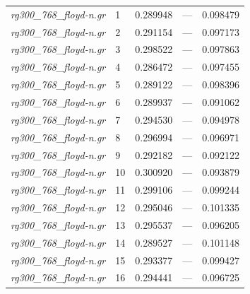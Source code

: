 \documentclass[12pt]{article}
\begin{document}
\begin{longtable}{l|l|lll}
\textit{rg300\_768\_floyd-n.gr}  &  1        & 0.289948               & ---                  & 0.098479                   \\
\textit{rg300\_768\_floyd-n.gr}  &  2        & 0.291154               & ---                  & 0.097173                   \\
\textit{rg300\_768\_floyd-n.gr}  &  3        & 0.298522               & ---                  & 0.097863                   \\
\textit{rg300\_768\_floyd-n.gr}  &  4        & 0.286472               & ---                  & 0.097455                   \\
\textit{rg300\_768\_floyd-n.gr}  &  5        & 0.289122               & ---                  & 0.098396                   \\
\textit{rg300\_768\_floyd-n.gr}  &  6        & 0.289937               & ---                  & 0.091062                   \\
\textit{rg300\_768\_floyd-n.gr}  &  7        & 0.294530               & ---                  & 0.094978                   \\
\textit{rg300\_768\_floyd-n.gr}  &  8        & 0.296994               & ---                  & 0.096971                   \\
\textit{rg300\_768\_floyd-n.gr}  &  9        & 0.292182               & ---                  & 0.092122                   \\
\textit{rg300\_768\_floyd-n.gr}  &  10       & 0.300920               & ---                  & 0.093879                   \\
\textit{rg300\_768\_floyd-n.gr}  &  11       & 0.299106               & ---                  & 0.099244                   \\
\textit{rg300\_768\_floyd-n.gr}  &  12       & 0.295046               & ---                  & 0.101335                   \\
\textit{rg300\_768\_floyd-n.gr}  &  13       & 0.295537               & ---                  & 0.096205                   \\
\textit{rg300\_768\_floyd-n.gr}  &  14       & 0.289527               & ---                  & 0.101148                   \\
\textit{rg300\_768\_floyd-n.gr}  &  15       & 0.293377               & ---                  & 0.099427                   \\
\textit{rg300\_768\_floyd-n.gr}  &  16       & 0.294441               & ---                  & 0.096725                   \\

\end{longtable}
\end{document}
